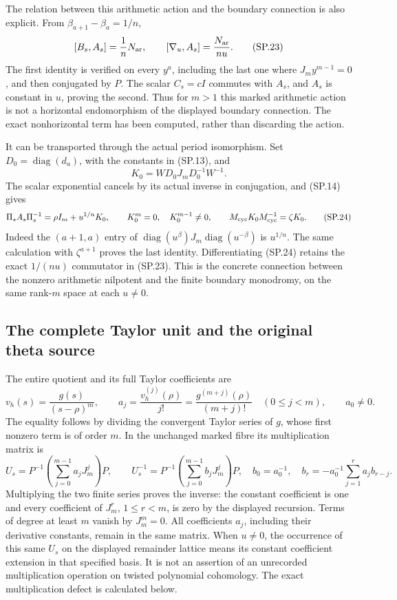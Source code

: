 The relation between this arithmetic action and the boundary
connection is also explicit. From
\(\beta_{a+1}-\beta_a=1/n\),
\[
 [B_s,A_s]=\frac1nN_{\rm ar},\qquad
 [\nabla_u,A_s]=\frac{N_{\rm ar}}{nu}.
 \tag{SP.23}\label{eq:sp-commutator}
\]
The first identity is verified on every \(y^a\), including
the last one where \(J_my^{m-1}=0\), and then conjugated
by \(P\). The scalar \(C_s=cI\) commutes with \(A_s\),
and \(A_s\) is constant in \(u\), proving the second.
Thus for \(m>1\) this marked arithmetic action is not a
horizontal endomorphism of the displayed boundary connection.
The exact nonhorizontal term has been computed, rather
than discarding the action.

It can be transported through the actual period isomorphism.
Set \(D_0=\operatorname{diag}(d_a)\), with the constants
in (SP.13), and
\[
 K_0=WD_0J_mD_0^{-1}W^{-1}.
 \]
The scalar exponential cancels by its actual inverse in
conjugation, and (SP.14) gives
\[
 \Pi_s A_s\Pi_s^{-1}
    =\rho I_m+u^{1/n}K_0,\qquad
 K_0^m=0,\quad K_0^{m-1}\ne0,\qquad
 M_{\rm cyc}K_0M_{\rm cyc}^{-1}=\zeta K_0 .
 \tag{SP.24}\label{eq:sp-periodaction}
\]
Indeed the \((a+1,a)\) entry of
\(\operatorname{diag}(u^{\beta})J_m
\operatorname{diag}(u^{-\beta})\) is \(u^{1/n}\).
The same calculation with \(\zeta^{a+1}\) proves the last
identity. Differentiating (SP.24) retains the exact
\(1/(nu)\) commutator in (SP.23).
This is the concrete connection between the nonzero
arithmetic nilpotent and the finite boundary monodromy,
on the same rank-\(m\) space at each \(u\ne0\).

\subsection{The complete Taylor unit and the original theta source}

The entire quotient and its full Taylor coefficients are
\[
 v_h(s)=\frac{g(s)}{(s-\rho)^m},\qquad
 a_j=\frac{v_h^{(j)}(\rho)}{j!}
       =\frac{g^{(m+j)}(\rho)}{(m+j)!}\quad(0\le j<m),
 \qquad a_0\ne0 .
 \tag{SP.25}\label{eq:sp-unitcoeff}
\]
The equality follows by dividing the convergent Taylor
series of \(g\), whose first nonzero term is of order \(m\).
In the unchanged marked fibre its multiplication matrix is
\[
 U_s=P^{-1}\left(\sum_{j=0}^{m-1}a_jJ_m^j\right)P,
 \qquad
 U_s^{-1}=P^{-1}\left(\sum_{j=0}^{m-1}b_jJ_m^j\right)P,
 \quad
 b_0=a_0^{-1},\quad
 b_r=-a_0^{-1}\sum_{j=1}^r a_jb_{r-j}.
 \tag{SP.26}\label{eq:sp-unitmatrix}
\]
Multiplying the two finite series proves the inverse:
the constant coefficient is one and every coefficient of
\(J_m^r\), \(1\le r<m\), is zero by the displayed recursion.
Terms of degree at least \(m\) vanish by \(J_m^m=0\).
All coefficients \(a_j\), including their derivative constants,
remain in the same matrix.
When \(u\ne0\), the occurrence of this same \(U_s\) on the
displayed remainder lattice means its constant coefficient
extension in that specified basis. It is not an assertion of
an unrecorded multiplication operation on twisted polynomial
cohomology. The exact multiplication defect is calculated below.

